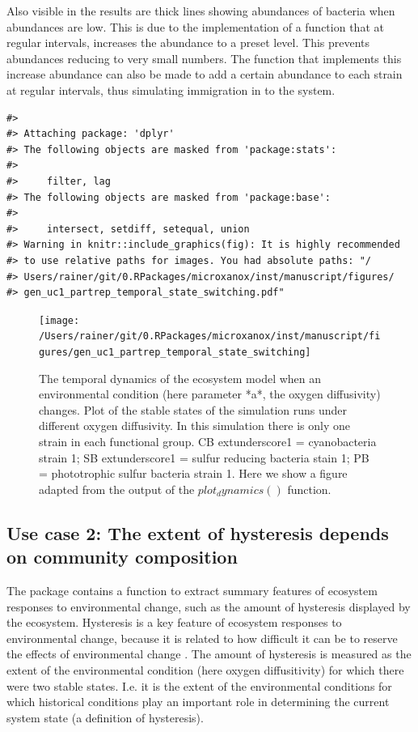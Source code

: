 \documentclass[]{elsarticle} %
\begin{document}
Also visible in the results are thick lines showing abundances of
bacteria when abundances are low. This is due to the implementation of a
function that at regular intervals, increases the abundance to a preset
level. This prevents abundances reducing to very small numbers. The
function that implements this increase abundance can also be made to add
a certain abundance to each strain at regular intervals, thus simulating
immigration in to the system.

\begin{verbatim}
#> 
#> Attaching package: 'dplyr'
#> The following objects are masked from 'package:stats':
#> 
#>     filter, lag
#> The following objects are masked from 'package:base':
#> 
#>     intersect, setdiff, setequal, union
#> Warning in knitr::include_graphics(fig): It is highly recommended
#> to use relative paths for images. You had absolute paths: "/
#> Users/rainer/git/0.RPackages/microxanox/inst/manuscript/figures/
#> gen_uc1_partrep_temporal_state_switching.pdf"
\end{verbatim}

\begin{figure}

{\centering \texttt{[image: /Users/rainer/git/0.RPackages/microxanox/inst/manuscript/figures/gen\_uc1\_partrep\_temporal\_state\_switching]} 

}

\caption{The temporal dynamics of the ecosystem model when an environmental condition (here parameter *a*, the oxygen diffusivity) changes. Plot of the stable states of the simulation runs under different oxygen diffusivity. In this simulation there is only one strain in each functional group. CB   extunderscore1 = cyanobacteria strain 1; SB extunderscore1 = sulfur reducing bacteria stain 1; PB = phototrophic sulfur bacteria strain 1. Here we show a figure adapted from the output of the $plot_dynamics()$  function.}\label{fig:uc1}
\end{figure}

\hypertarget{use-case-2-the-extent-of-hysteresis-depends-on-community-composition}{%
\subsection{Use case 2: The extent of hysteresis depends on community
composition}\label{use-case-2-the-extent-of-hysteresis-depends-on-community-composition}}

The package contains a function to extract summary features of ecosystem
responses to environmental change, such as the amount of hysteresis
displayed by the ecosystem. Hysteresis is a key feature of ecosystem
responses to environmental change, because it is related to how
difficult it can be to reserve the effects of environmental change
\citep{Scheffer2001}. The amount of hysteresis is measured as the extent
of the environmental condition (here oxygen diffusitivity) for which
there were two stable states. I.e. it is the extent of the environmental
conditions for which historical conditions play an important role in
determining the current system state (a definition of hysteresis).
\end{document}
